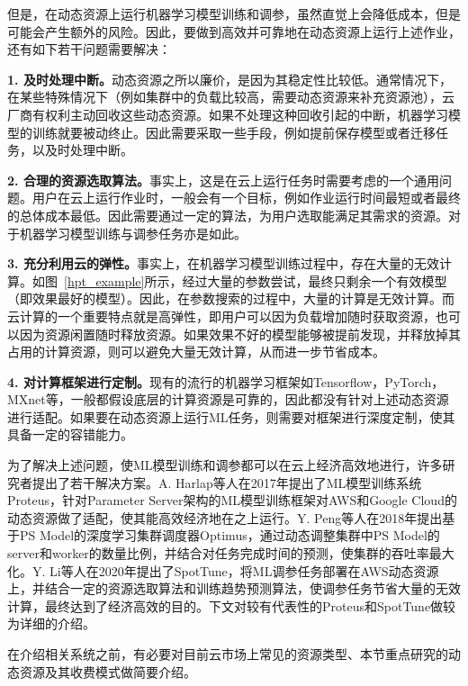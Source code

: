 但是，在动态资源上运行机器学习模型训练和调参，虽然直觉上会降低成本，但是可能会产生额外的风险。因此，要做到高效并可靠地在动态资源上运行上述作业，还有如下若干问题需要解决：

\textbf{1. 及时处理中断。}动态资源之所以廉价，是因为其稳定性比较低。通常情况下，在某些特殊情况下（例如集群中的负载比较高，需要动态资源来补充资源池），云厂商有权利主动回收这些动态资源。如果不处理这种回收引起的中断，机器学习模型的训练就要被动终止。因此需要采取一些手段，例如提前保存模型或者迁移任务，以及时处理中断。

\textbf{2. 合理的资源选取算法。}事实上，这是在云上运行任务时需要考虑的一个通用问题。用户在云上运行作业时，一般会有一个目标，例如作业运行时间最短或者最终的总体成本最低。因此需要通过一定的算法，为用户选取能满足其需求的资源。对于机器学习模型训练与调参任务亦是如此。

\textbf{3. 充分利用云的弹性。}事实上，在机器学习模型训练过程中，存在大量的无效计算。如图~\ref{hpt_example}所示，经过大量的参数尝试，最终只剩余一个有效模型（即效果最好的模型）。因此，在参数搜索的过程中，大量的计算是无效计算。而云计算的一个重要特点就是高弹性，即用户可以因为负载增加随时获取资源，也可以因为资源闲置随时释放资源。如果效果不好的模型能够被提前发现，并释放掉其占用的计算资源，则可以避免大量无效计算，从而进一步节省成本。

\textbf{4. 对计算框架进行定制。}现有的流行的机器学习框架如Tensorflow\parencite{abadi2016tensorflow}，PyTorch\parencite{paszke2019pytorch}，MXnet\parencite{chen2015mxnet}等，一般都假设底层的计算资源是可靠的，因此都没有针对上述动态资源进行适配。如果要在动态资源上运行ML任务，则需要对框架进行深度定制，使其具备一定的容错能力。

为了解决上述问题，使ML模型训练和调参都可以在云上经济高效地进行，许多研究者提出了若干解决方案。A. Harlap等人在2017年提出了ML模型训练系统Proteus\parencite{harlap2017proteus}，针对Parameter Server架构的ML模型训练框架对AWS和Google Cloud的动态资源做了适配，使其能高效经济地在之上运行。Y. Peng等人在2018年提出基于PS Model的深度学习集群调度器Optimus\parencite{peng2018optimus}，通过动态调整集群中PS Model的server和worker的数量比例，并结合对任务完成时间的预测，使集群的吞吐率最大化。Y. Li等人在2020年提出了SpotTune\parencite{li2020spottune}，将ML调参任务部署在AWS动态资源上，并结合一定的资源选取算法和训练趋势预测算法，使调参任务节省大量的无效计算，最终达到了经济高效的目的。下文对较有代表性的Proteus和SpotTune做较为详细的介绍。

在介绍相关系统之前，有必要对目前云市场上常见的资源类型、本节重点研究的动态资源及其收费模式做简要介绍。

